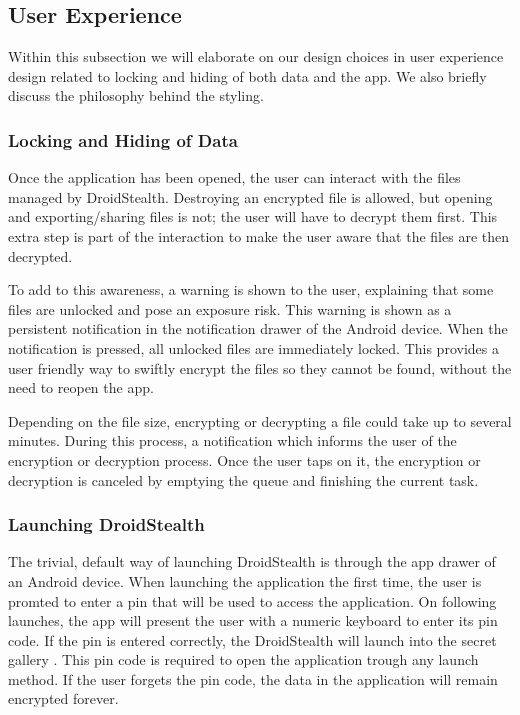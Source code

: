 \subsection{User Experience}
\label{sec:user-experience}
Within this subsection we will elaborate on our design choices in user experience design related to locking and hiding of both data and the app.
We also briefly discuss the philosophy behind the styling.


\subsubsection{Locking and Hiding of Data}
Once the application has been opened, the user can interact with the files managed by DroidStealth.
Destroying an encrypted file is allowed, but opening and exporting/sharing files is not; the user will have to decrypt them first.
This extra step is part of the interaction to make the user aware that the files are then decrypted.

To add to this awareness, a warning is shown to the user, explaining that some files are unlocked and pose an exposure risk.
This warning is shown as a persistent notification in the notification drawer of the Android device.
When the notification is pressed, all unlocked files are immediately locked.
This provides a user friendly way to swiftly encrypt the files so they cannot be found, without the need to reopen the app.

Depending on the file size, encrypting or decrypting a file could take up to several minutes.
During this process, a notification which informs the user of the encryption or decryption process.
Once the user taps on it, the encryption or decryption is canceled by emptying the queue and finishing the current task.

\subsubsection{Launching DroidStealth}
The trivial, default way of launching DroidStealth is through the app drawer of an Android device. 
When launching the application the first time, the user is promted to enter a pin that will be used to access the application.
On following launches, the app will present the user with a numeric keyboard to enter its pin code. 
If the pin is entered correctly, the DroidStealth will launch into the secret gallery .
This pin code is required to open the application trough any launch method.
If the user forgets the pin code, the data in the application will remain encrypted forever.

